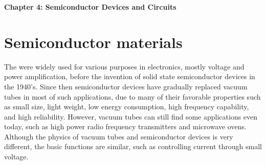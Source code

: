 \documentclass{article}
\begin{document}
{\bf Chapter 4: Semiconductor Devices and Circuits}

\section*{Semiconductor materials}

The  were widely used for various purposes in electronics, mostly voltage 
and power amplification, before the invention of solid state semiconductor 
devices in the 1940's. Since then semiconductor devices have gradually replaced
vacuum tubes in most of such applications, due to many of their favorable 
properties such as small size, light weight, low energy consumption, high 
frequency capability, and high reliability. However, vacuum tubes can still 
find some applications even today, such as high power radio frequency transmitters
and microwave ovens. Although the physics of vacuum tubes and semiconductor 
devices is very different, the basic functions are similar, such as controlling
current through small voltage.
\end{document}
